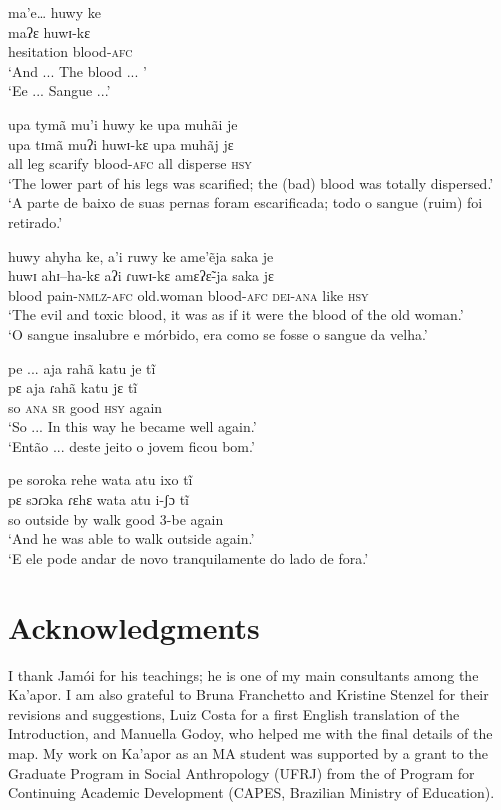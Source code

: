 \documentclass[output=paper,
modfonts,nonflat
]{langsci/langscibook}
\begin{document}
\ea ma'e… huwy ke \\[.3em]
\gll maʔɛ huwɪ-kɛ \\
hesitation blood-\textsc{afc} \\
\glt ‘And ... The blood ... ’ \\
‘Ee ... Sangue ...’\\
\z

\ea upa tymã mu’i huwy ke upa muhãi je \\[.3em]
\gll upa tɪmã muʔi huwɪ-kɛ upa muhãj jɛ \\
all leg scarify blood-\textsc{afc} all disperse \textsc{hsy} \\
\glt ‘The lower part of his legs was scarified; the (bad) blood was totally dispersed.’ \\
‘A parte de baixo de suas pernas foram escarificada; todo o sangue (ruim) foi retirado.’ \\
\z

\ea huwy ahyha ke, a’i ruwy ke ame'ẽja saka je \\[.3em]
\gll huwɪ ahɪ–ha-kɛ aʔi ɾuwɪ-kɛ amɛʔɛ̃-ja saka jɛ \\
blood pain-\textsc{nmlz}-\textsc{afc} old.woman blood-\textsc{afc} \textsc{dei-ana} like \textsc{hsy} \\
\glt ‘The evil and toxic blood, it was as if it were the blood of the old woman.’ \\
‘O sangue insalubre e mórbido, era como se fosse o sangue da velha.’ \\
\z

\ea pe ... aja rahã katu je tĩ \\[.3em]
\gll pɛ aja ɾahã katu jɛ tĩ \\
so \textsc{ana} \textsc{sr} good \textsc{hsy} again \\
\glt ‘So ... In this way he became well again.’ \\
‘Então ... deste jeito o jovem ficou bom.’ \\
\z

\ea pe soroka rehe wata atu ixo tĩ \\[.3em]
\gll pɛ sɔɾɔka ɾɛhɛ wata atu i-ʃɔ tĩ \\
so outside by walk good 3-be again \\
\glt ‘And he was able to walk outside again.’ \\
‘E ele pode andar de novo tranquilamente do lado de fora.’ \\
\z

\section*{Acknowledgments}
I thank Jamói for his teachings; he is one of my main  consultants among the Ka'apor. I am also grateful to Bruna Franchetto and Kristine Stenzel for their revisions and suggestions,  Luiz Costa for a first English translation of the Introduction, and Manuella Godoy, who helped me with the final details of the map. My work on Ka’apor as an MA student was supported by a grant to the Graduate Program in Social Anthropology  (UFRJ) from the of Program for Continuing Academic Development (CAPES, Brazilian Ministry of Education).
\end{document}
